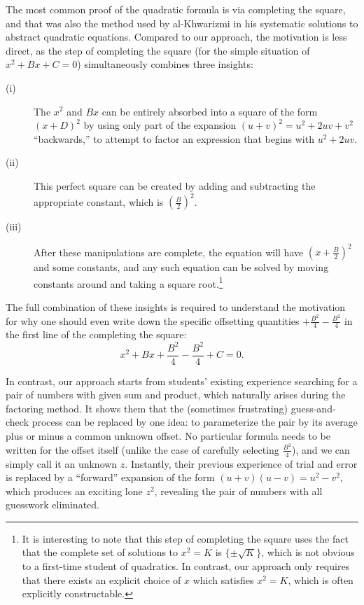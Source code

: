 \documentclass[11pt]{article}
\begin{document}
The most common proof of the quadratic formula is via completing the square, and
that was also the method used by al-Khwarizmi \cite{al-khwarizmi} in his
systematic solutions to abstract quadratic equations. Compared to our approach,
the motivation is less direct, as the step of completing the square (for the
simple situation of $x^2 + Bx + C = 0$) simultaneously combines three insights:
\begin{description}
  \item[(i)] The $x^2$ and $Bx$ can be entirely absorbed into a square of
    the form $(x + D)^2$ by using only part of the expansion $(u+v)^2 = u^2
    + 2uv + v^2$ ``backwards,'' to attempt to factor an expression that
    begins with $u^2 + 2uv$.
  \item[(ii)] This perfect square can be created by adding and subtracting the
    appropriate constant, which is $(\frac{B}{2})^2$.
  \item[(iii)] After these manipulations are complete, the equation will have
    $(x + \frac{B}{2})^2$ and some constants, and any such equation can be
    solved by moving constants around and taking a square
    root.\footnote{\label{ftCompSqr} It is interesting to note that this step of
    completing the square uses the fact that the complete set of solutions to
    $x^2 = K$ is $\{\pm \sqrt{K}\}$, which is not obvious to a first-time
  student of quadratics. In contrast, our approach only requires that there
exists an explicit choice of $x$ which satisfies $x^2 = K$, which is often
explicitly constructable.}
\end{description}
The full combination of these insights is required to understand the motivation
for why one should even write down the specific offsetting quantities
$+\frac{B^2}{4} - \frac{B^2}{4}$ in the first line of the completing the square:
\begin{displaymath}
  x^2 + Bx + \frac{B^2}{4} - \frac{B^2}{4} + C = 0.
\end{displaymath}

In contrast, our approach starts from students' existing experience searching
for a pair of numbers with given sum and product, which naturally arises during
the factoring method.  It shows them that the (sometimes frustrating)
guess-and-check process can be replaced by one idea: to parameterize the pair by
its average plus or minus a common unknown offset. No particular formula needs
to be written for the offset itself (unlike the case of carefully selecting
$\frac{B^2}{4}$), and we can simply call it an unknown $z$. Instantly, their
previous experience of trial and error is replaced by a ``forward'' expansion of
the form $(u+v)(u-v) = u^2 - v^2$, which produces an exciting lone $z^2$,
revealing the pair of numbers with all guesswork eliminated.
\end{document}
